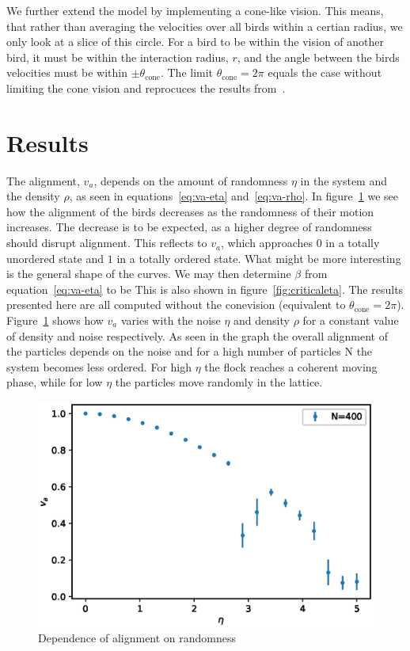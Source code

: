 \documentclass[twoside,twocolumn]{article}
\begin{document}
We further extend the model by implementing a cone-like vision. This means, that 
rather than averaging the velocities over all birds within a certian radius, we 
only look at a slice of this circle. For a bird to be within the vision of 
another bird, it must be within the interaction radius, $r$, and the angle 
between the birds velocities must be within $\pm \theta_{\text{cone}}$. The 
limit $\theta_{\text{cone}} = 2\pi$ equals the case without limiting the
cone vision and reprocuces the results from~\cite{Vicsek}.


\section{Results}

The alignment, $v_a$, depends on the amount of randomness $\eta$ in the system 
and the density $\rho$, as seen in equations~\eqref{eq:va-eta} and~\eqref{eq:va-rho}.
In figure~\ref{fig:va_over_eta} we see how the alignment of 
the birds decreases as the randomness of their motion increases. The decrease 
is to be expected, as a higher degree of randomness should disrupt alignment. 
This reflects to $v_a$, which approaches $0$ in a totally unordered state and $1$
in a totally ordered state.
What might be more interesting is the general shape of the curves. We may then 
determine $\beta$ from equation~\eqref{eq:va-eta} to be 
This is also shown in figure~\ref{fig:criticaleta}. The results presented here 
are all computed without the conevision (equivalent to $\theta_{\text{cone}} = 2\pi$). 
Figure~\ref{fig:va_over_eta} shows how $v_a$ varies with the noise $\eta$ and 
density $\rho$ for a constant value of density and noise respectively.
As seen in the graph the overall alignment of the particles depends 
on the noise and for a high number of particles N the system becomes less ordered. 
For high $\eta$ the flock reaches a coherent moving phase, while for low $\eta$ 
the particles move randomly in the lattice.  


\begin{figure}[!htb]
  \centering
  \includegraphics[width=\columnwidth]{va_over_eta}
  \caption{Dependence of alignment on randomness}\label{fig:va_over_eta}
\end{figure}
\end{document}
